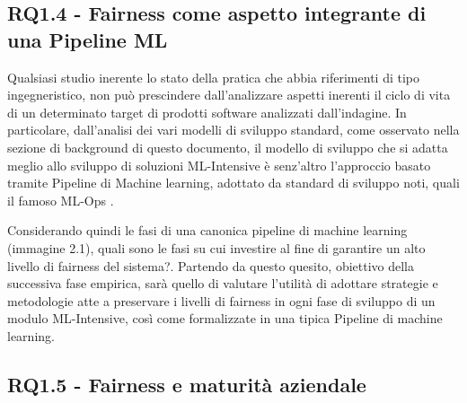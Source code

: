     
    \subsection{RQ1.4 - Fairness come aspetto integrante di una Pipeline ML}
    	\begin{center}
    	\hspace*{-5mm}%
    \end{center}
    
    Qualsiasi studio inerente lo stato della pratica che abbia riferimenti di tipo ingegneristico, non può prescindere dall'analizzare aspetti inerenti il ciclo di vita di un determinato target di prodotti software analizzati dall'indagine. In particolare, dall'analisi dei vari modelli di sviluppo standard, come osservato nella sezione di background di questo documento, il modello di sviluppo che si adatta meglio allo sviluppo di soluzioni ML-Intensive è senz'altro l'approccio basato tramite Pipeline di Machine learning, adottato da standard di sviluppo noti, quali il famoso ML-Ops \cite{MLOps}. 
    
    Considerando quindi le fasi di una canonica pipeline di machine learning (immagine 2.1), quali sono le fasi su cui investire al fine di garantire un alto livello di fairness del sistema?. Partendo da questo quesito, obiettivo della successiva fase empirica, sarà quello di valutare l'utilità di adottare strategie e metodologie atte a preservare i livelli di fairness in ogni fase di sviluppo di un modulo ML-Intensive, così come formalizzate in una tipica Pipeline di machine learning.   
    
    
    \subsection{RQ1.5 - Fairness e maturità aziendale}
    \begin{center}
    	\hspace*{-5mm}%
    \end{center}
      
